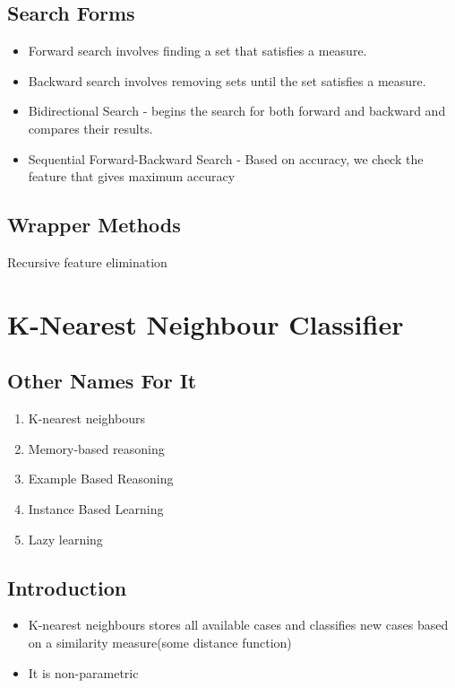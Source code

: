 \documentclass[11pt]{article}
\begin{document}
\subsection{Search Forms}
\label{sec:orge7f635f}
\begin{itemize}
\item Forward search involves finding a set that satisfies a measure.
\item Backward search involves removing sets until the set satisfies a measure.
\item Bidirectional Search - begins the search for both forward and backward and compares their results.
\item Sequential Forward-Backward Search - Based on accuracy, we  check the feature that gives maximum accuracy
\end{itemize}
\subsection{Wrapper Methods}
\label{sec:org320d6fd}
Recursive feature elimination
\section{K-Nearest Neighbour Classifier}
\label{sec:org50a9861}
\subsection{Other Names For It}
\label{sec:org98cebc7}
\begin{enumerate}
\item K-nearest neighbours
\item Memory-based reasoning
\item Example Based Reasoning
\item Instance Based Learning
\item Lazy learning
\end{enumerate}
\subsection{Introduction}
\label{sec:org6660df3}

\begin{itemize}
\item K-nearest neighbours stores all available cases and classifies new cases based on a similarity measure(some distance function)
\item It is non-parametric
\end{itemize}
\end{document}
